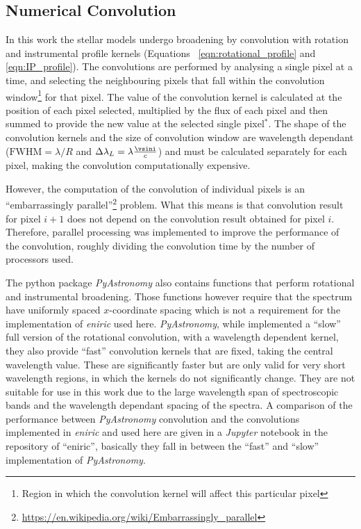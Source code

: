 \subsection{Numerical Convolution}
\label{subsec:numerical_convolution}
In this work the stellar models undergo broadening by convolution with rotation and instrumental profile kernels (Equations ~\ref{eqn:rotational_profile} and \ref{eqn:IP_profile}).
The convolutions are performed by analysing a single pixel at a time, and selecting the neighbouring pixels that fall within the convolution window\footnote{Region in which the convolution kernel will affect this particular pixel} for that pixel.
The value of the convolution kernel is calculated at the position of each pixel selected, multiplied by the flux of each pixel and then summed to provide the new value at the selected single pixel{$^\textbf{*}$}. 
 The shape of the convolution kernels and the size of convolution window are wavelength dependant (${\textrm{FWHM}}=\lambda / R$ and $\Delta\lambda_{L}=\lambda \frac{\vsini}{c}$) and must be calculated separately for each pixel, making the convolution computationally expensive.

 However, the computation of the convolution of individual pixels is an ``embarrassingly parallel''\footnote{\href{https://en.wikipedia.org/wiki/Embarrassingly\_parallel}{https://en.wikipedia.org/wiki/Embarrassingly\_parallel}} problem.
 What this means is that convolution result for pixel $i+1$ does not depend on the convolution result obtained for pixel $i$.
 Therefore, parallel processing was implemented to improve the performance of the convolution, roughly dividing the convolution time by the number of processors used.

The python package \emph{PyAstronomy} also contains functions that perform rotational and instrumental broadening. Those functions however require that the spectrum have uniformly spaced $x$-coordinate spacing which is not a requirement for the implementation of \emph{eniric} used here. \emph{PyAstronomy}, while implemented a ``slow'' full version of the rotational convolution, with a wavelength dependent kernel, they also provide ``fast'' convolution kernels that are fixed, taking the central wavelength value. These are significantly faster but are only valid for very short wavelength regions, in which the kernels do not significantly change. They are not suitable for use in this work due to the large wavelength span of spectroscopic bands and the wavelength dependant spacing of the spectra. A comparison of the performance between \emph{PyAstronomy} convolution and the convolutions implemented in \emph{eniric} and used here are given in a \emph{Jupyter} notebook in the repository of ``eniric'', basically they fall in between the ``fast'' and ``slow'' implementation of \emph{PyAstronomy}.

